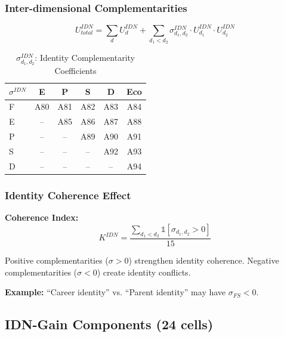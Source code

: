 \subsubsection{Inter-dimensional Complementarities}

\begin{equation}
U^{IDN}_{total} = \sum_d U^{IDN}_d + \sum_{d_1 < d_2} \sigma^{IDN}_{d_1,d_2} \cdot U^{IDN}_{d_1} \cdot U^{IDN}_{d_2}
\end{equation}

\begin{table}[htbp]
\centering
\caption{$\sigma^{IDN}_{d_1,d_2}$: Identity Complementarity Coefficients}
\label{tab:idn-sigma-matrix}
\small
\renewcommand{\arraystretch}{1.3}
\begin{tabular}{@{}lccccc@{}}
\toprule
$\sigma^{IDN}$ & E & P & S & D & Eco \\
\midrule
F & A80 & A81 & A82 & A83 & A84 \\
E & -- & A85 & A86 & A87 & A88 \\
P & -- & -- & A89 & A90 & A91 \\
S & -- & -- & -- & A92 & A93 \\
D & -- & -- & -- & -- & A94 \\
\bottomrule
\end{tabular}
\end{table}

\subsubsection{Identity Coherence Effect}

\begin{tcolorbox}[colback=orange!5!white, colframe=orange!50!black]
\textbf{Coherence Index:}
\begin{equation}
K^{IDN} = \frac{\sum_{d_1 < d_2} \mathbb{1}[\sigma_{d_1,d_2} > 0]}{15}
\end{equation}

Positive complementarities ($\sigma > 0$) strengthen identity coherence.
Negative complementarities ($\sigma < 0$) create identity conflicts.

\textbf{Example:} ``Career identity'' vs. ``Parent identity'' may have $\sigma_{FS} < 0$.
\end{tcolorbox}

\subsection{IDN-Gain Components (24 cells)}

